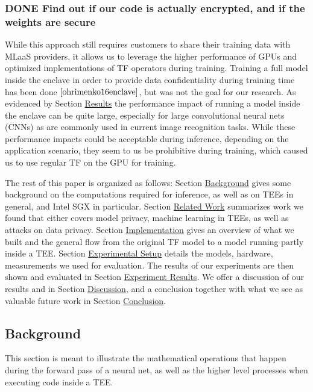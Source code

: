\documentclass[11pt]{article}
\begin{document}
\subsubsection{{\bfseries\sffamily DONE} Find out if our code is actually encrypted, and if the weights are secure}
\label{sec:org0c32c5e}
While this approach still requires customers to share their training data with MLaaS providers, it allows us to leverage the higher performance of GPUs and optimized implementations of TF operators during training.
Training a full model inside the enclave in order to provide data confidentiality during training time has been done \(\cite{ohrimenko16enclave}\), but was not the goal for our research.
As evidenced by Section \hyperref[org53997ba]{Results} the performance impact of running a model inside the enclave can be quite large, especially for large convolutional neural nets (CNNs) as are commonly used in current image recognition tasks.
While these performance impacts could be acceptable during inference, depending on the application scenario, they seem to us be prohibitive during training, which caused us to use regular TF on the GPU for training.

The rest of this paper is organized as follows:
Section \hyperref[orgee69e47]{Background} gives some background on the computations required for inference, as well as on TEEs in general, and Intel SGX in particular.
Section \hyperref[org9a57082]{Related Work} summarizes work we found that either covers model privacy, machine learning in TEEs, as well as attacks on data privacy.
Section \hyperref[org2e69037]{Implementation} gives an overview of what we built and the general flow from the original TF model to a model running partly inside a TEE.
Section \hyperref[org038acad]{Experimental Setup} details the models, hardware, measurements we used for evaluation.
The results of our experiments are then shown and evaluated in Section \hyperref[org53997ba]{Experiment Results}.
We offer a discussion of our results and in Section \hyperref[orga541d40]{Discussion}, and a conclusion together with what we see as valuable future work in Section \hyperref[org62c5e91]{Conclusion}.

\subsection{Background}
\label{sec:orgf178e3d}
\label{orgee69e47}

This section is meant to illustrate the mathematical operations that happen during the forward pass of a neural net, as well as the higher level processes when executing code inside a TEE.
\end{document}
